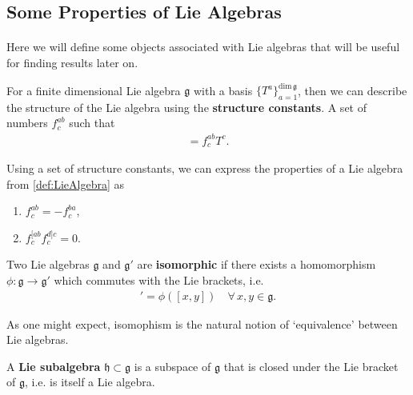 \documentclass[11pt,fleqn]{article}
\begin{document}
\subsection{Some Properties of Lie Algebras}

\paragraph{} Here we will define some objects associated with Lie algebras that will be useful for finding results later on.

\begin{definition}
	For a finite dimensional Lie algebra $\mathfrak{g}$ with a basis $\{ T^a \}_{a=1}^{\text{dim} \, \mathfrak{g} }$, then we can describe the structure of the Lie algebra using the \textbf{structure constants}. A set of numbers $f^{ab}_c$ such that
		\begin{align}
			[T^a,T^b] = f^{ab}_c T^c.
		\end{align}
\end{definition}

\begin{remark}
	Using a set of structure constants, we can express the properties of a Lie algebra from \autoref{def:LieAlgebra} as
		\begin{enumerate}[label = (\roman*)]
			\item $f^{ab}_c = -f^{ba}_c$,
			\item $f_c^{[ab}f_c^{d]c} = 0$.
		\end{enumerate}
\end{remark}

\begin{definition}
	Two Lie algebras $\mathfrak{g}$ and $\mathfrak{g}'$ are \textbf{isomorphic} if there exists a homomorphism $\phi : \mathfrak{g} \to \mathfrak{g}'$ which commutes with the Lie brackets, i.e.
		\begin{align}
			[\phi(x), \phi(y)]' = \phi \left( [ x,y ] \right) \quad \forall \, x,y \in \mathfrak{g}.
		\end{align}
\end{definition}

\begin{remark}
	As one might expect, isomophism is the natural notion of `equivalence' between Lie algebras.
\end{remark}

\begin{definition}
	A \textbf{Lie subalgebra} $\mathfrak{h} \subset \mathfrak{g}$ is a subspace of $\mathfrak{g}$ that is closed under the Lie bracket of $\mathfrak{g}$, i.e. is itself a Lie algebra.
\end{definition}
\end{document}
